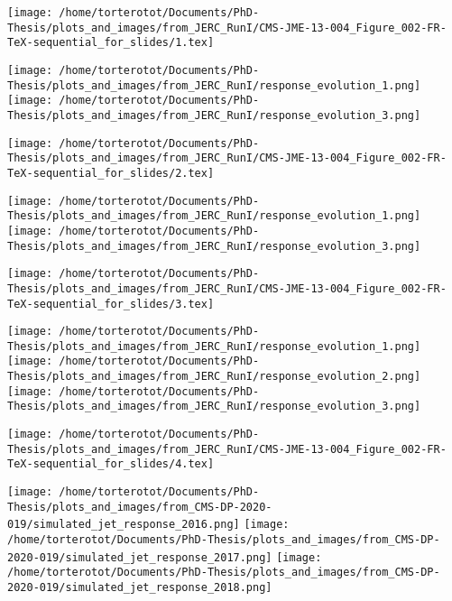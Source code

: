 \begin{frame}[t]
\large
\texttt{[image: /home/torterotot/Documents/PhD-Thesis/plots\_and\_images/from\_JERC\_RunI/CMS-JME-13-004\_Figure\_002-FR-TeX-sequential\_for\_slides/1.tex]}

\vfill

\texttt{[image: /home/torterotot/Documents/PhD-Thesis/plots\_and\_images/from\_JERC\_RunI/response\_evolution\_1.png]}
\hfill
\texttt{[image: /home/torterotot/Documents/PhD-Thesis/plots\_and\_images/from\_JERC\_RunI/response\_evolution\_3.png]}
\end{frame}

\begin{frame}[t]
\addtocounter{framenumber}{-1}
\large
\texttt{[image: /home/torterotot/Documents/PhD-Thesis/plots\_and\_images/from\_JERC\_RunI/CMS-JME-13-004\_Figure\_002-FR-TeX-sequential\_for\_slides/2.tex]}

\vfill

\texttt{[image: /home/torterotot/Documents/PhD-Thesis/plots\_and\_images/from\_JERC\_RunI/response\_evolution\_1.png]}
\hfill
\texttt{[image: /home/torterotot/Documents/PhD-Thesis/plots\_and\_images/from\_JERC\_RunI/response\_evolution\_3.png]}
\end{frame}

\begin{frame}[t]
\addtocounter{framenumber}{-1}
\large
\texttt{[image: /home/torterotot/Documents/PhD-Thesis/plots\_and\_images/from\_JERC\_RunI/CMS-JME-13-004\_Figure\_002-FR-TeX-sequential\_for\_slides/3.tex]}

\vfill

\texttt{[image: /home/torterotot/Documents/PhD-Thesis/plots\_and\_images/from\_JERC\_RunI/response\_evolution\_1.png]}
\hfill
\texttt{[image: /home/torterotot/Documents/PhD-Thesis/plots\_and\_images/from\_JERC\_RunI/response\_evolution\_2.png]}
\hfill
\texttt{[image: /home/torterotot/Documents/PhD-Thesis/plots\_and\_images/from\_JERC\_RunI/response\_evolution\_3.png]}
\end{frame}

\begin{frame}[t]
\addtocounter{framenumber}{-1}
\large
\texttt{[image: /home/torterotot/Documents/PhD-Thesis/plots\_and\_images/from\_JERC\_RunI/CMS-JME-13-004\_Figure\_002-FR-TeX-sequential\_for\_slides/4.tex]}

\vfill

\texttt{[image: /home/torterotot/Documents/PhD-Thesis/plots\_and\_images/from\_CMS-DP-2020-019/simulated\_jet\_response\_2016.png]}
\hfill
\texttt{[image: /home/torterotot/Documents/PhD-Thesis/plots\_and\_images/from\_CMS-DP-2020-019/simulated\_jet\_response\_2017.png]}
\hfill
\texttt{[image: /home/torterotot/Documents/PhD-Thesis/plots\_and\_images/from\_CMS-DP-2020-019/simulated\_jet\_response\_2018.png]}
\end{frame}

